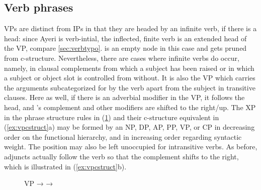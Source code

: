 
\subsection{Verb phrases}
\label{subsec:vps}

VPs are distinct from IPs in that they are
headed by an infinite verb, if there is a head: since Ayeri is verb-intial,
the inflected, finite verb is an extended head of the VP, compare
\autoref{sec:verbtypo}.  is an empty node in this case and gets
pruned from c-structure. Nevertheless, there are cases where infinite verbs
do occur, namely, in clausal complements from which a subject has been raised
or in which a subject or object slot is controlled from without. It is also the
VP which carries the arguments subcategorized for by the verb apart
from the subject in transitive clauses. Here as well, if there is an adverbial
modifier in the VP, it follows the head, and 's complement and other
modifiers are shifted to the right/up. The XP in the phrase structure rules in
(\ref{ex:vppstruct}) and their c-structure equivalent in (\ref{ex:vpcstruct}a)
may be formed by an NP, DP, AP, PP, VP, or CP in decreasing order on the
functional hierarchy, and in increasing order regarding syntactic weight. The
position may also be left unoccupied for intransitive verbs. As before,
adjuncts actually follow the verb so that the complement shifts to the right,
which is illustrated in (\ref{ex:vpcstruct}b).

\begin{figure}
\pex\label{ex:vppstruct}
\a VP →  
\a {} →  
\xe
\end{figure}

